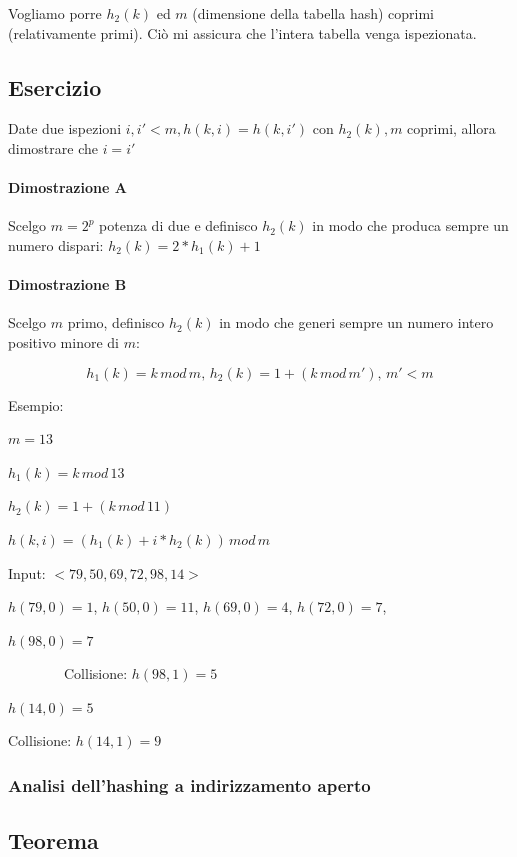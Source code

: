 \documentclass[tikz]{article}
\let\oldparagraph\paragraph
\renewcommand{\paragraph}[1]{\oldparagraph{#1}\mbox{}}
\begin{document}
{Vogliamo porre $h_2(k)$ ed $m$ (dimensione della tabella hash) coprimi (relativamente primi). Ciò mi assicura che l'intera tabella venga ispezionata.}

\subsection{Esercizio}

{Date due ispezioni $i,i' < m, h(k,i) = h(k,i')$ con $h_2(k),m$ coprimi, allora dimostrare che $i=i'$}

\paragraph{Dimostrazione A}

{Scelgo $m=2^p$ potenza di due e definisco $h_2(k)$ in modo che produca sempre un numero dispari: $h_2(k) = 2*h_1(k)+1$}

\paragraph{Dimostrazione B}

{Scelgo $m$ primo, definisco $h_2(k)$ in modo che generi sempre un numero intero positivo minore di $m$:}

\begin{equation}
h_1(k)=k\,mod\,m,\,h_2(k)=1+(k\,mod\,m'),\,m' < m
\end{equation}

{Esempio:}

$m=13$

$h_1(k)=k\,mod\,13$

$h_2(k)=1 + (k\,mod\,11)$

$h(k,i) = (h_1(k) + i * h_2(k))\,mod\,m$

{Input: $<79,50,69,72,98,14>$}

$h(79,0)=1$, $h(50,0)=11$, $h(69,0)=4$, $h(72,0)=7$, 

$h(98,0)=7$

{~~~~~~~~Collisione: $h(98,1) = 5$}

$h(14,0)=5$

{Collisione: $h(14,1) = 9$}

\subsubsection{Analisi dell'hashing a indirizzamento aperto}

\subsection{Teorema}
\end{document}
